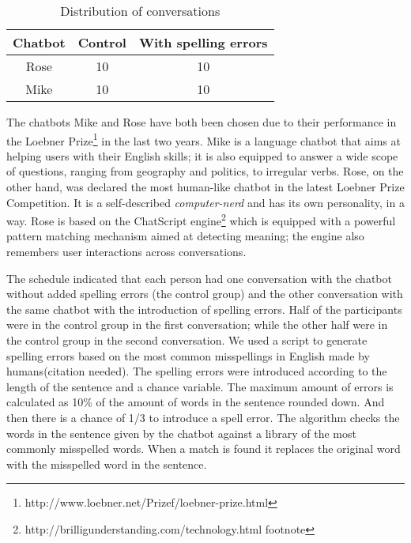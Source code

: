 \begin{table}[!ht]
   \begin{center}
      \caption{Distribution of conversations}
      \label{tabdistributionofconversations}
      \vskip 0.12in
      \begin{tabular}[center]{| c | c | c |}
         \hline
         Chatbot & Control & With spelling errors \\
         \hline \hline
         Rose & 10 & 10\\
         Mike & 10 & 10\\
         \hline
      \end{tabular}
   \end{center}
\end{table}

The chatbots Mike and Rose have both been chosen due to their performance in the Loebner Prize\footnote{http://www.loebner.net/Prizef/loebner-prize.html} in the last two years. Mike is a language chatbot that aims at helping users with their English skills; it is also equipped to answer a wide scope of questions, ranging from geography and politics, to irregular verbs. Rose, on the other hand, was declared the most human-like chatbot in the latest Loebner Prize Competition. It is a self-described \textit{computer-nerd} and has its own personality, in a way. Rose is based on the ChatScript engine\footnote{http://brilligunderstanding.com/technology.html footnote} which is equipped with a powerful pattern matching mechanism aimed at detecting meaning; the engine also remembers user interactions across conversations.

The schedule indicated that each person had one conversation with the chatbot without added spelling errors (the control group) and the other conversation with the same chatbot with the introduction of spelling errors. Half of the participants were in the control group in the first conversation; while the other half were in the control group in the second conversation. We used a script to generate spelling errors based on the most common misspellings in English made by humans(citation needed). The spelling errors were introduced according to the length of the sentence and a chance variable. The maximum amount of errors is calculated as 10\% of the amount of words in the sentence rounded down. And then there is a chance of 1/3 to introduce a spell error. The algorithm checks the words in the sentence given by the chatbot against a library of the most commonly misspelled words. When a match is found it replaces the original word with the misspelled word in the sentence.

